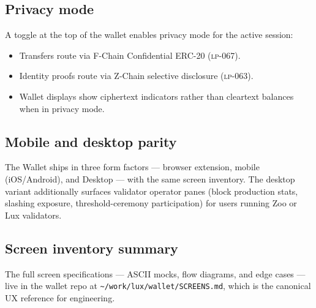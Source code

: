 \subsection{Privacy mode}

A toggle at the top of the wallet enables privacy mode for the active
session:

\begin{itemize}[leftmargin=1.2em]
  \item Transfers route via F-Chain Confidential ERC-20 (\textsc{lp-067}).
  \item Identity proofs route via Z-Chain selective disclosure
        (\textsc{lp-063}).
  \item Wallet displays show ciphertext indicators rather than
        cleartext balances when in privacy mode.
\end{itemize}

\subsection{Mobile and desktop parity}

The \Lux{} Wallet ships in three form factors --- browser extension,
mobile (iOS/Android), and \Lux{} Desktop --- with the same screen
inventory. The desktop variant additionally surfaces validator
operator panes (block production stats, slashing exposure,
threshold-ceremony participation) for users running Zoo or Lux
validators.

\subsection{Screen inventory summary}

The full screen specifications --- ASCII mocks, flow diagrams, and
edge cases --- live in the wallet repo at
\texttt{\textasciitilde/work/lux/wallet/SCREENS.md}, which is the
canonical UX reference for engineering.
